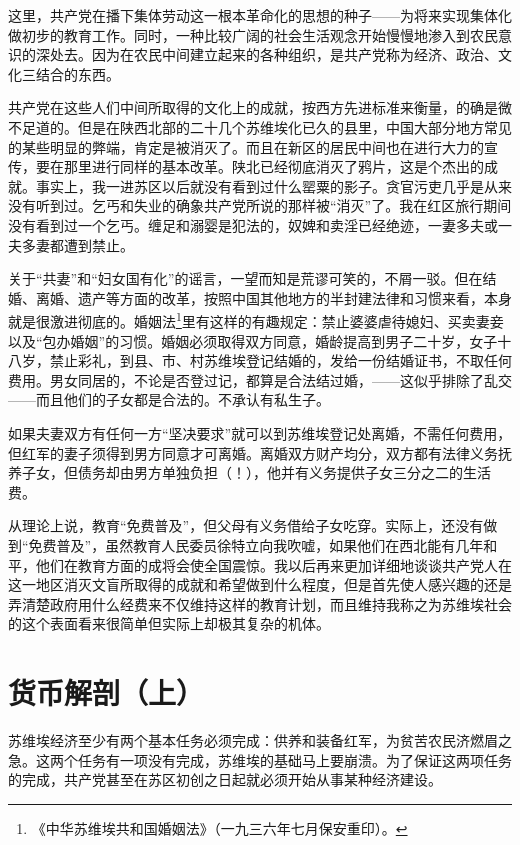 \documentclass[10pt]{book}
\begin{document}
这里，共产党在播下集体劳动这一根本革命化的思想的种子——为将来实现集体化做初步的教育工作。同时，一种比较广阔的社会生活观念开始慢慢地渗入到农民意识的深处去。因为在农民中间建立起来的各种组织，是共产党称为经济、政治、文化三结合的东西。

共产党在这些人们中间所取得的文化上的成就，按西方先进标准来衡量，的确是微不足道的。但是在陕西北部的二十几个苏维埃化已久的县里，中国大部分地方常见的某些明显的弊端，肯定是被消灭了。而且在新区的居民中间也在进行大力的宣传，要在那里进行同样的基本改革。陕北已经彻底消灭了鸦片，这是个杰出的成就。事实上，我一进苏区以后就没有看到过什么罂粟的影子。贪官污吏几乎是从来没有听到过。乞丐和失业的确象共产党所说的那样被“消灭”了。我在红区旅行期间没有看到过一个乞丐。缠足和溺婴是犯法的，奴婢和卖淫已经绝迹，一妻多夫或一夫多妻都遭到禁止。

关于“共妻”和“妇女国有化”的谣言，一望而知是荒谬可笑的，不屑一驳。但在结婚、离婚、遗产等方面的改革，按照中国其他地方的半封建法律和习惯来看，本身就是很激进彻底的。婚姻法\footnote{《中华苏维埃共和国婚姻法》（一九三六年七月保安重印）。}里有这样的有趣规定：禁止婆婆虐待媳妇、买卖妻妾以及“包办婚姻”的习惯。婚姻必须取得双方同意，婚龄提高到男子二十岁，女子十八岁，禁止彩礼，到县、市、村苏维埃登记结婚的，发给一份结婚证书，不取任何费用。男女同居的，不论是否登过记，都算是合法结过婚，——这似乎排除了乱交——而且他们的子女都是合法的。不承认有私生子。

如果夫妻双方有任何一方“坚决要求”就可以到苏维埃登记处离婚，不需任何费用，但红军的妻子须得到男方同意才可离婚。离婚双方财产均分，双方都有法律义务抚养子女，但债务却由男方单独负担（！），他并有义务提供子女三分之二的生活费。

从理论上说，教育“免费普及”，但父母有义务借给子女吃穿。实际上，还没有做到“免费普及”，虽然教育人民委员徐特立向我吹嘘，如果他们在西北能有几年和平，他们在教育方面的成将会使全国震惊。我以后再来更加详细地谈谈共产党人在这一地区消灭文盲所取得的成就和希望做到什么程度，但是首先使人感兴趣的还是弄清楚政府用什么经费来不仅维持这样的教育计划，而且维持我称之为苏维埃社会的这个表面看来很简单但实际上却极其复杂的机体。



\section{货币解剖（上）}

苏维埃经济至少有两个基本任务必须完成：供养和装备红军，为贫苦农民济燃眉之急。这两个任务有一项没有完成，苏维埃的基础马上要崩溃。为了保证这两项任务的完成，共产党甚至在苏区初创之日起就必须开始从事某种经济建设。
\end{document}
